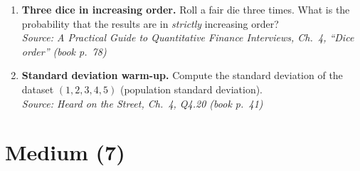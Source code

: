 \documentclass[11pt]{article}
\begin{document}
\begin{enumerate}[label=\textbf{\arabic*.}]
\item \textbf{Three dice in increasing order.}
Roll a fair die three times. What is the probability that the results are in \emph{strictly} increasing order?\\
\hfill{\small\textit{Source: A Practical Guide to Quantitative Finance Interviews, Ch.\ 4, ``Dice order'' (book p.\ 78)}}

\item \textbf{Standard deviation warm-up.}
Compute the standard deviation of the dataset $(1,2,3,4,5)$ (population standard deviation).\\
\hfill{\small\textit{Source: Heard on the Street, Ch.\ 4, Q4.20 (book p.\ 41)}}

\end{enumerate}

\section*{Medium (7)}
\end{document}
